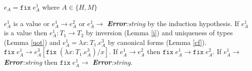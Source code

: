 \begin{case}
$e_{A}=\mathtt{fix}\;e_{A}^{1}$ where $A\in\lbrace H,M\rbrace$

$e_{A}^{1}$ is a value or $e_{A}^{1}\rightarrow e_{A}^{2}$ or $e_{A}^{1}\rightarrow$ \emph{\textbf{Error}:\;string} by the induction hypothesis.  If $e_{A}^{1}$ is a value then $e_{A}^{1}:T_{1}\rightarrow T_{2}$ by inversion (Lemma \ref{i}) and uniqueness of types (Lemma \ref{uot}) and $e_{A}^{1}=\lambda x:T_{1}.e_{A}^{3}$ by canonical forms (Lemma \ref{cf}).  $\mathtt{fix}\;e_{A}^{1}\rightarrow e_{A}^{3}[\mathtt{fix}\;(\lambda x:T_{1}.e_{A}^{3})/x]$.  If $e_{A}^{1}\rightarrow e_{A}^{2}$ then $\mathtt{fix}\;e_{A}^{1}\rightarrow\mathtt{fix}\;e_{A}^{2}$.  If $e_{A}^{1}\rightarrow$ \emph{\textbf{Error}:\;string} then $\mathtt{fix}\;e_{A}^{1}\rightarrow$ \emph{\textbf{Error}:\;string}.
\end{case}